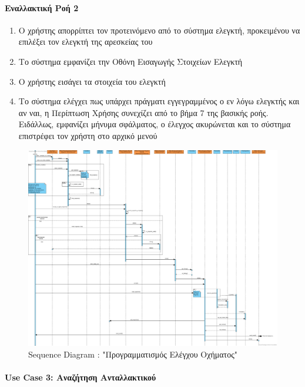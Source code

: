 \documentclass{../ol-softwaremanual}
\begin{document}
	\paragraph{Εναλλακτική Ροή 2}
	
	\begin{enumerate}
		\item Ο χρήστης απορρίπτει τον προτεινόμενο από το σύστημα ελεγκτή, προκειμένου να επιλέξει τον ελεγκτή της αρεσκείας του
		\item Το σύστημα εμφανίζει την Οθόνη Εισαγωγής Στοιχείων Ελεγκτή
		\item Ο χρήστης εισάγει τα στοιχεία του ελεγκτή
		\item Το σύστημα ελέγχει πως υπάρχει πράγματι εγγεγραμμένος ο εν λόγω ελεγκτής και αν ναι, η Περίπτωση Χρήσης συνεχίζει από το βήμα 7 της βασικής ροής. Ειδάλλως, εμφανίζει μήνυμα σφάλματος, ο έλεγχος ακυρώνεται και το σύστημα επιστρέφει τον χρήστη στο αρχικό μενού
	\end{enumerate}	
	
	
	\begin{figure}[htbp!]
		\centering
		\includegraphics[scale=0.185]{img/seq_car_check.png}
		\caption{\en Sequence Diagram : "\gr Προγραμματισμός Ελέγχου Οχήματος\en"\gr}
	\end{figure}
	
	
	\newpage
	\centering
	
	\paragraph{\en Use Case 3: \gr Αναζήτηση Ανταλλακτικού}	
	
\end{document}

